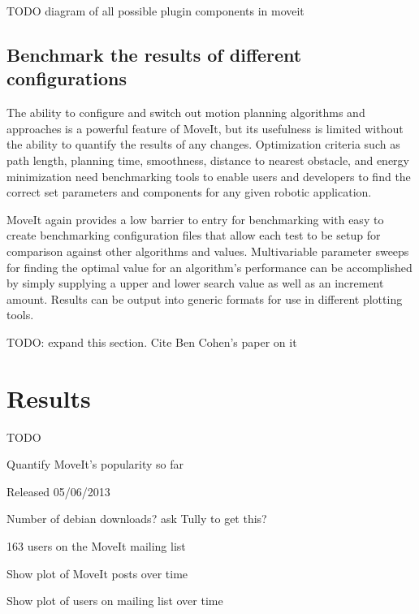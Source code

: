 \documentclass[10pt,journal,compsoc]{joser1}
\begin{document}
{TODO diagram of all possible plugin components in moveit

\subsection{Benchmark the results of different configurations}

The ability to configure and switch out motion planning algorithms and approaches is a powerful feature of MoveIt, but its usefulness is limited without the ability to quantify the results of any changes. Optimization criteria such as path length, planning time, smoothness, distance to nearest obstacle, and energy minimization need benchmarking tools to enable users and developers to find the correct set parameters and components for any given robotic application.

MoveIt again provides a low barrier to entry for benchmarking with easy to create benchmarking configuration files that allow each test to be setup for comparison against other algorithms and values. Multivariable parameter sweeps for finding the optimal value for an algorithm's performance can be accomplished by simply supplying a upper and lower search value as well as an increment amount. Results can be output into generic formats for use in different plotting tools.

TODO: expand this section. Cite Ben Cohen's paper on it

\section{Results}
\label{sec::results}

TODO 

Quantify MoveIt's popularity so far

Released 05/06/2013

Number of debian downloads? ask Tully to get this?

163 users on the MoveIt mailing list

Show plot of MoveIt posts over time

Show plot of users on mailing list over time

}
\end{document}
